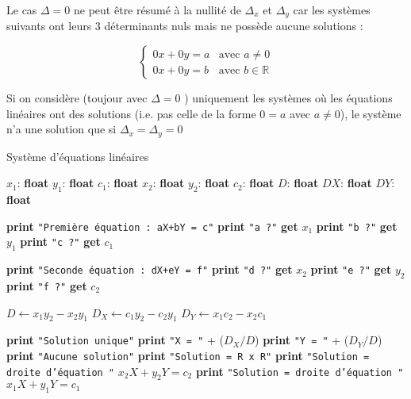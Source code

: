 \documentclass[a4paper,10pt]{report}
\newcommand\Printtt[1]{\State \textbf{print }\texttt{"#1"}}
\newcommand\Get{\State \textbf{get }}
\begin{document}
Le cas $\Delta = 0$ ne peut être résumé à la nullité de $\Delta_x$ et $\Delta_y$ car les systèmes suivants
ont leurs 3 déterminants nuls mais ne possède aucune solutions :

\begin{displaymath}
	\begin{cases}
		0x + 0y = a & \text{avec } a \neq 0 \\
		0x + 0y = b & \text{avec } b \in \mathbb{R}
	\end{cases}
\end{displaymath}

Si on considère (toujour avec $\Delta = 0$ ) uniquement les systèmes où les équations linéaires ont des solutions 
(i.e. pas celle de la forme $0=a$ avec $a\neq 0$), le système n'a une solution que si $\Delta_x = \Delta_y = 0$ 


\begin{algorithm}
	\caption{Système d'équations linéaires}
	\begin{algorithmic}
		\Vars
			\State $x_1$: \textbf{float}
			\State $y_1$: \textbf{float}
			\State $c_1$: \textbf{float}
			\State $x_2$: \textbf{float}
			\State $y_2$: \textbf{float}
			\State $c_2$: \textbf{float}
			\State $D$: \textbf{float}
			\State $DX$: \textbf{float}
			\State $DY$: \textbf{float}
		\EndVars
		
		\Statex
		\Begin
			\Printtt{Première équation : aX+bY = c} 
			\Printtt{a ?}
			\Get $x_1$
			\Printtt{b ?}
			\Get $y_1$
			\Printtt{c ?}
			\Get $c_1$
			
			\Printtt{Seconde équation : dX+eY = f}
			\Printtt{d ?}
			\Get $x_2$
			\Printtt{e ?}
			\Get $y_2$
			\Printtt{f ?}
			\Get $c_2$
			
			\Statex {}
			\State $D \leftarrow x_1 y_2-x_2y_1$ 
			\State $D_X \leftarrow c_1y_2-c_2y_1$
			\State $D_Y \leftarrow x_1c_2-x_2c_1$
			
			\Statex
				\Printtt{Solution unique}
				\Printtt{X = } + ($D_X / D$)
				\Printtt{Y = } + ($D_Y / D$)
				\Printtt{Aucune solution}
					\Printtt{Solution = R x R}
				\Else
					\Printtt{Solution = droite d'équation } $x_2X + y_2Y =c_2$
				\EndIf
			\Else
				\Printtt{Solution = droite d'équation } $x_1X + y_1Y =c_1$
			\EndIf
		\End
	\end{algorithmic}
\end{algorithm}
\end{document}

